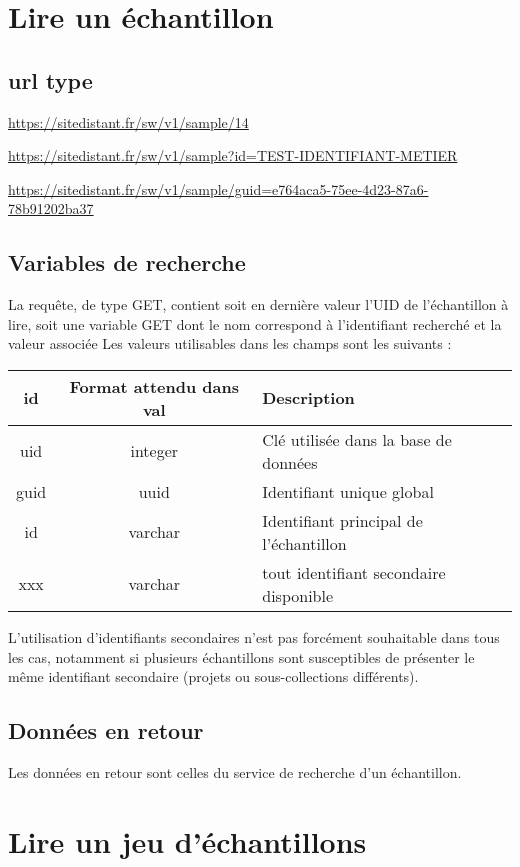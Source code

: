 \section{Lire un échantillon}

\subsection{url type}
\url{https://sitedistant.fr/sw/v1/sample/14}

\url{https://sitedistant.fr/sw/v1/sample?id=TEST-IDENTIFIANT-METIER}

\url{https://sitedistant.fr/sw/v1/sample/guid=e764aca5-75ee-4d23-87a6-78b91202ba37}

\subsection{Variables de recherche}
La requête, de type GET, contient soit en dernière valeur l'UID de l'échantillon à lire, soit une variable GET dont le nom correspond à l'identifiant recherché et la valeur associée
Les valeurs utilisables dans les champs sont les suivants :
\begin{savenotes}
\begin{longtable}{|c|c|>{\raggedright\arraybackslash}p{7cm}|}
\hline 
id & Format attendu dans val & Description \\ 
\hline
uid & integer & Clé utilisée dans la base de données \\
\hline
guid & uuid & Identifiant unique global \\
\hline
id & varchar & Identifiant principal de l'échantillon\\
\hline
xxx & varchar & tout identifiant secondaire disponible
\\
\hline \endhead

\end{longtable}
\end{savenotes}
L'utilisation d'identifiants secondaires n'est pas forcément souhaitable dans tous les cas, notamment si plusieurs échantillons sont susceptibles de présenter le même identifiant secondaire (projets ou sous-collections différents).
\subsection{Données en retour}
Les données en retour sont celles du service de recherche d'un échantillon.

\section{Lire un jeu d'échantillons}
